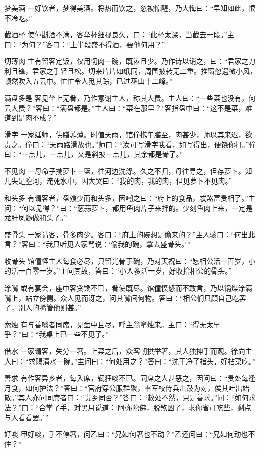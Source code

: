 \documentclass[12pt,UTF8]{ctexbook}
\begin{document}
梦美酒
一好饮者，梦得美酒。将热而饮之，忽被惊醒，乃大悔曰：“早知如此，恨不冷吃。”

截酒杯
使僮斟酒不满，客举杯细视良久，曰：“此杯太深，当截去一段。”主曰：“为何？”客曰：“上半段盛不得酒，要他何用？”

切薄肉
主有留客定饭，仅用切肉一碗，既嚣且少。乃作诗以诮之，曰：“君家之刀利且锋，君家之手轻且松。切来片片如纸同，周围披转无二重。推窗忽遇微小风，顿然吹入五云中。忙忙令人觅其踪，已过巫山十二峰。”

满盘多是
客见坐上无肴，乃作意谢主人，称其大费。主人曰：“一些菜也没有，何云大费？”客曰：“满盘都是。”主人曰：“菜在那里？”客指盘中曰：“这不是菜，难道到是肉不成？”

滑字
一家延师，供膳菲薄。时值天雨，馆僮携午膳至，肉甚少，师以其来迟，欲责之。僮曰：“天雨路滑故也。”师曰：“汝可写滑字我看，如写得出，便饶你打。”僮曰：“一点儿，一点儿，又是斜披一点儿，其余都是骨了。”

不见肉
一母命子携萝卜一篮，往河边洗涤。久之不归，母往寻之，但存萝卜。知儿失足堕河，淹死水中，因大哭曰：“我的肉，我的肉，但见萝卜不见肉。”

和头多
有请客者，盘飧少而和头多，因嘲之曰：“府上的食品，忒煞富贵相了。”主问：“何以见得？”曰：“葱蒜萝卜，都用鱼肉片子来拌的。少刻鱼肉上来，一定是龙肝凤髓做和头了。”

盛骨头
一家请客，骨多肉少。客曰：“府上的碗想是偷来的？”主人骇曰：“何出此言？”客曰：“我只听见人家骂说：‘偷我的碗，拿去盛骨头。’”

收骨头
馆僮怪主人每食必尽，只留光骨于碗，乃对天祝曰：“愿相公活一百岁，小的活一百零一岁。”主问其故，答曰：“小人多活一岁，好收拾相公的骨头。”

涂嘴
或有宴会，座中客贪馋不已，肴使既尽。馆僮愤怒而不敢言，乃以锅煤涂满嘴上，站立傍侧。众人见而讶之，问其嘴间何物。答曰：“相公们只顾自己吃罢了，别人的嘴管他则甚。”

索烛
有与善啖者同席，见盘中且尽，呼主翁拿烛来。主曰：“得无太早乎？”曰：“我桌上已一些不见了。”

借水
一家请客，失分一箸。上菜之后，众客朝拱举箸，其人独抻手而观。徐向主人曰：“求赐清水一碗。”主问曰：“何处用之？”答曰：“洗干净了指头，好拈菜吃。”

善求
有作客异乡者，每入席，辄狂啖不已。同席之人甚恶之，因问曰：“贵处每逢月食，如何护法？”答曰：“官府穿公服群聚，率军校侍兵击鼓为对，俟其吐出始散。”其人亦问同席者曰：“贵乡同否？”答曰：“敝处不然，只是善求。”问：“如何求法？”曰：“合掌了手，对黑月说道：‘阿弥陀佛，脱煞凶了，求你省可吃些，剩点与人看看罢。’”

好啖
甲好啖，手不停箸，问乙曰：“兄如何箸也不动？”乙还问曰：“兄如何动也不住？”
\end{document}
